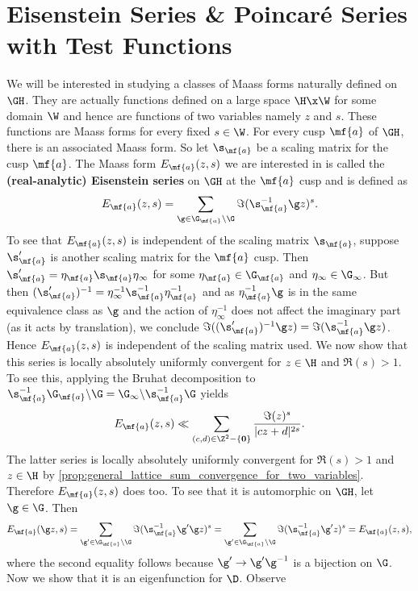   \section{Eisenstein Series \& Poincar\'e Series with Test Functions}
    We will be interested in studying a classes of Maass forms naturally defined on $\GH$. They are actually functions defined on a large space $\H \x \W$ for some domain $\W$ and hence are functions of two variables namely $z$ and $s$. These functions are Maass forms for every fixed $s \in \W$. For every cusp $\mf{a}$ of $\GH$, there is an associated Maass form. So let $\s_{\mf{a}}$ be a scaling matrix for the cusp $\mf{a}$. The Maass form $E_{\mf{a}}(z,s)$ we are interested in is called the \textbf{(real-analytic) Eisenstein series} on $\GH$ at the $\mf{a}$ cusp and is defined as
    \[
      E_{\mf{a}}(z,s) = \sum_{\g \in \G_{\mf{a}}\backslash\G}\Im(\s_{\mf{a}}^{-1}\g z)^{s}.
    \]
    To see that $E_{\mf{a}}(z,s)$ is independent of the scaling matrix $\s_{\mf{a}}$, suppose $\s_{\mf{a}}'$ is another scaling matrix for the $\mf{a}$ cusp. Then $\s_{\mf{a}}' = \eta_{\mf{a}}\s_{\mf{a}}\eta_{\infty}$ for some $\eta_{\mf{a}} \in \G_{\mf{a}}$ and $\eta_{\infty} \in \G_{\infty}$. But then $(\s_{\mf{a}}')^{-1} = \eta_{\infty}^{-1}\s_{\mf{a}}^{-1}\eta_{\mf{a}}^{-1}$ and as $\eta_{\mf{a}}^{-1}\g$ is in the same equivalence class as $\g$ and the action of $\eta_{\infty}^{-1}$ does not affect the imaginary part (as it acts by translation), we conclude $\Im((\s_{\mf{a}}')^{-1}\g z) = \Im(\s_{\mf{a}}^{-1}\g z)$. Hence $E_{\mf{a}}(z,s)$ is independent of the scaling matrix used. We now show that this series is locally absolutely uniformly convergent for $z \in \H$ and $\Re(s) > 1$. To see this, applying the Bruhat decomposition to $\s_{\mf{a}}^{-1}\G_{\mf{a}}\backslash\G = \G_{\infty}\backslash\s_{\mf{a}}^{-1}\G$ yields
    \[
      E_{\mf{a}}(z,s) \ll \sum_{(c,d) \in \Z^{2}-\{\mathbf{0}\}}\frac{\Im(z)^{s}}{|cz+d|^{2s}}.
    \]
    The latter series is locally absolutely uniformly convergent for $\Re(s) > 1$ and $z \in \H$ by \cref{prop:general_lattice_sum_convergence_for_two_variables}. Therefore $E_{\mf{a}}(z,s)$ does too. To see that it is automorphic on $\GH$, let $\g \in \G$. Then
    \[
      E_{\mf{a}}(\g z,s) = \sum_{\g' \in \G_{\mf{a}}\backslash\G}\Im(\s_{\mf{a}}^{-1}\g'\g z)^{s} = \sum_{\g' \in \G_{\mf{a}}\backslash\G}\Im(\s_{\mf{a}}^{-1}\g'z)^{s} = E_{\mf{a}}(z,s),
    \]
    where the second equality follows because $\g' \to \g'\g^{-1}$ is a bijection on $\G$. Now we show that it is an eigenfunction for $\D$. Observe
